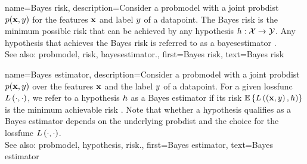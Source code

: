 {name={Bayes risk},
	description={Consider a \gls{probmodel} with a joint \gls{probdist} $p({\bf x},y)$ for 
		the \glspl{feature} ${\bf x}$ and \gls{label} $y$ of a \gls{datapoint}. The 
		Bayes \gls{risk} is the \gls{minimum} possible \gls{risk} that can be achieved by any \gls{hypothesis} 
		$h: \mathcal{X} \rightarrow \mathcal{Y}$. Any \gls{hypothesis} that achieves 
		the Bayes \gls{risk} is referred to as a \gls{bayesestimator} \cite{LC}.
		\\
		See also: \gls{probmodel}, \gls{risk}, \gls{bayesestimator}.},
	first={Bayes risk},
	text={Bayes risk}
}
	
{name={Bayes estimator},
	description={Consider a \gls{probmodel} with a joint \gls{probdist} 
		$p({\bf x},y)$ over the \glspl{feature} ${\bf x}$ and the \gls{label} $y$ 
		of a \gls{datapoint}. For a given \gls{lossfunc} $L\left(\cdot,\cdot \right)$, we refer to a \gls{hypothesis} 
		$h$ as a Bayes estimator if its \gls{risk} 
		$\mathbb{E}\left\{L\left(\left( {\bf x},y \right),h \right)\right\}$
		is the \gls{minimum} achievable \gls{risk} \cite{LC}. 
		Note that whether a \gls{hypothesis} qualifies as a Bayes estimator depends on 
		the underlying \gls{probdist} and the choice for the \gls{lossfunc} $L\left(\cdot,\cdot \right)$.
		\\
		See also: \gls{probmodel}, \gls{hypothesis}, \gls{risk}.},
	first={Bayes estimator},
	text={Bayes estimator}
}


